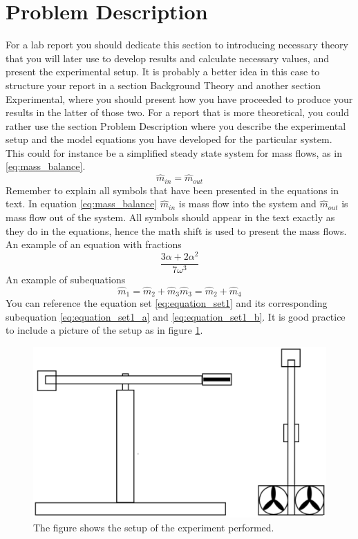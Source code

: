 \section{Problem Description}
\label{sec:problem_description}
For a lab report you should dedicate this section to introducing necessary theory that you will later use to develop results and calculate necessary values, and present the experimental setup. It is probably a better idea in this case to structure your report in a section Background Theory and another section Experimental, where you should present how you have proceeded to produce your results in the latter of those two. For a report that is more theoretical, you could rather use the section Problem Description where you describe the experimental setup and the model equations you have developed for the particular system. This could for instance be a simplified steady state system for mass flows, as in \ref{eq:mass_balance}.
\begin{equation}
    \label{eq:mass_balance}
    \hat{m}_{in} = \hat{m}_{out}
\end{equation}
Remember to explain all symbols that have been presented in the equations in text. In equation \ref{eq:mass_balance} $\hat{m}_{in}$ is mass flow into the system and $\hat{m}_{out}$ is mass flow out of the system. All symbols should appear in the text exactly as they do in the equations, hence the math shift is used to present the mass flows.
An example of an equation with fractions
\begin{equation}
    \frac
    {3\alpha + 2\alpha^2}
    {7\omega^3}
\end{equation}
An example of subequations
\begin{subequations}
    \label{eq:equation_set1}
    \begin{equation}
        \label{eq:equation_set1_a}
        \hat{m}_{1} = \hat{m}_{2} + \hat{m}_{3}
    \end{equation}
    \begin{equation}
        \label{eq:equation_set1_b}
        \hat{m}_{3} = \hat{m}_{2} + \hat{m}_{4}
    \end{equation}
\end{subequations}
You can reference the equation set \ref{eq:equation_set1} and its corresponding subequation \ref{eq:equation_set1_a} and \ref{eq:equation_set1_b}.
It is good practice to include a picture of the setup as in figure \ref{fig:setup}.
\begin{figure}[htb]
    \centering
    \includegraphics[scale=0.5]{Problem_description/figures/helikopter.eps}
    \caption{The figure shows the setup of the experiment performed.}
    \label{fig:setup}
\end{figure}
